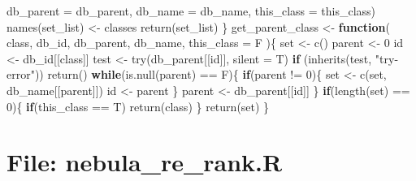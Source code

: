 \documentclass[
]{article}
\newenvironment{Shaded}{\begin{snugshade}}{\end{snugshade}}
\newcommand{\AttributeTok}[1]{\textcolor[rgb]{0.77,0.63,0.00}{#1}}
\newcommand{\ControlFlowTok}[1]{\textcolor[rgb]{0.13,0.29,0.53}{\textbf{#1}}}
\newcommand{\DecValTok}[1]{\textcolor[rgb]{0.00,0.00,0.81}{#1}}
\newcommand{\FunctionTok}[1]{\textcolor[rgb]{0.00,0.00,0.00}{#1}}
\newcommand{\NormalTok}[1]{#1}
\newcommand{\OtherTok}[1]{\textcolor[rgb]{0.56,0.35,0.01}{#1}}
\newcommand{\SpecialCharTok}[1]{\textcolor[rgb]{0.00,0.00,0.00}{#1}}
\newcommand{\StringTok}[1]{\textcolor[rgb]{0.31,0.60,0.02}{#1}}
\begin{document}
\begin{Shaded}
\begin{Highlighting}[]
                                  \AttributeTok{db\_parent =}\NormalTok{ db\_parent,}
                                  \AttributeTok{db\_name =}\NormalTok{ db\_name,}
                                  \AttributeTok{this\_class =}\NormalTok{ this\_class)}
    \FunctionTok{names}\NormalTok{(set\_list) }\OtherTok{\textless{}{-}}\NormalTok{ classes}
    \FunctionTok{return}\NormalTok{(set\_list)}
\NormalTok{  \}}
\NormalTok{get\_parent\_class }\OtherTok{\textless{}{-}} 
  \ControlFlowTok{function}\NormalTok{(}
\NormalTok{           class,}
\NormalTok{           db\_id,}
\NormalTok{           db\_parent,}
\NormalTok{           db\_name,}
           \AttributeTok{this\_class =}\NormalTok{ F}
\NormalTok{           )\{}
\NormalTok{    set }\OtherTok{\textless{}{-}} \FunctionTok{c}\NormalTok{()}
\NormalTok{    parent }\OtherTok{\textless{}{-}} \DecValTok{0}
\NormalTok{    id }\OtherTok{\textless{}{-}}\NormalTok{ db\_id[[class]]}
\NormalTok{    test }\OtherTok{\textless{}{-}} \FunctionTok{try}\NormalTok{(db\_parent[[id]], }\AttributeTok{silent =}\NormalTok{ T)}
    \ControlFlowTok{if}\NormalTok{ (}\FunctionTok{inherits}\NormalTok{(test, }\StringTok{"try{-}error"}\NormalTok{))}
      \FunctionTok{return}\NormalTok{()}
    \ControlFlowTok{while}\NormalTok{(}\FunctionTok{is.null}\NormalTok{(parent) }\SpecialCharTok{==}\NormalTok{ F)\{}
      \ControlFlowTok{if}\NormalTok{(parent }\SpecialCharTok{!=} \DecValTok{0}\NormalTok{)\{}
\NormalTok{        set }\OtherTok{\textless{}{-}} \FunctionTok{c}\NormalTok{(set, db\_name[[parent]])}
\NormalTok{        id }\OtherTok{\textless{}{-}}\NormalTok{ parent}
\NormalTok{      \}}
\NormalTok{      parent }\OtherTok{\textless{}{-}}\NormalTok{ db\_parent[[id]]}
\NormalTok{    \}}
    \ControlFlowTok{if}\NormalTok{(}\FunctionTok{length}\NormalTok{(set) }\SpecialCharTok{==} \DecValTok{0}\NormalTok{)\{}
      \ControlFlowTok{if}\NormalTok{(this\_class }\SpecialCharTok{==}\NormalTok{ T)}
        \FunctionTok{return}\NormalTok{(class)}
\NormalTok{    \}}
    \FunctionTok{return}\NormalTok{(set)}
\NormalTok{  \}}
\end{Highlighting}
\end{Shaded}

\hypertarget{file-nebula_re_rank.r}{%
\section{File: nebula\_re\_rank.R}\label{file-nebula_re_rank.r}}
\end{document}
